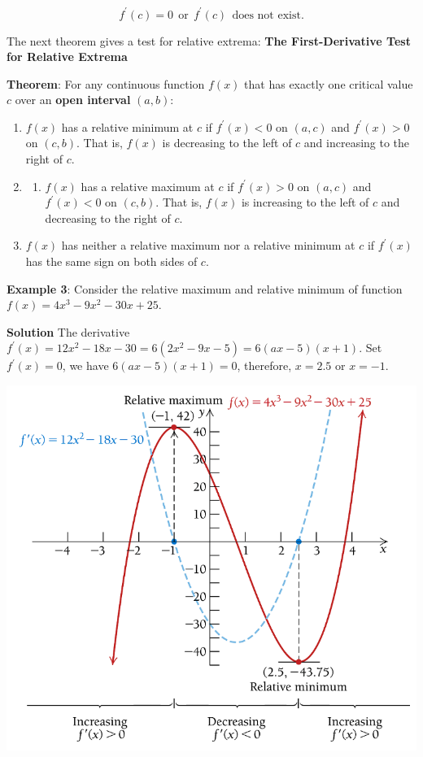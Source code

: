 \documentclass[
]{book}
\providecommand{\tightlist}{%
  \setlength{\itemsep}{0pt}\setlength{\parskip}{0pt}}
\begin{document}
\[
f^\prime(c) = 0 ~~\text{or}~~f^\prime(c) ~~ \text{does not exist.}
\]

The next theorem gives a test for relative extrema: \textbf{The First-Derivative Test for Relative Extrema}

\hfill\break

\textbf{Theorem}: For any continuous function \(f(x)\) that has exactly one critical value \(c\) over an \textbf{open interval} \((a, b)\):

\begin{enumerate}
\def\labelenumi{\arabic{enumi}.}
\item
  \(f(x)\) has a relative minimum at \(c\) if \(f^\prime(x) < 0\) on \((a, c)\) and \(f^\prime(x) > 0\) on \((c, b)\). That is, \(f(x)\) is decreasing to the left of \(c\) and increasing to the right of \(c\).
\item
  \begin{enumerate}
  \def\labelenumii{\arabic{enumii}.}
  \tightlist
  \item
    \(f(x)\) has a relative maximum at \(c\) if \(f^\prime(x) > 0\) on \((a, c)\) and \(f^\prime(x) < 0\) on \((c, b)\). That is, \(f(x)\) is increasing to the left of \(c\) and decreasing to the right of \(c\).
  \end{enumerate}
\item
  \(f(x)\) has neither a relative maximum nor a relative minimum at \(c\) if \(f^\prime(x)\) has the same sign on both sides of \(c\).
\end{enumerate}

\textbf{Example 3}: Consider the relative maximum and relative minimum of function \(f(x) = 4x^3 - 9x^2 - 30x + 25\).

\textbf{Solution} The derivative \(f^\prime(x) = 12x^2 - 18x -30 = 6(2x^2 - 9x - 5) = 6(ax-5)(x+1)\). Set \(f^\prime(x) = 0\), we have \(6(ax-5)(x+1) = 0\), therefore, \(x = 2.5\) or \(x = -1\).

\begin{center}\includegraphics[width=0.6\linewidth]{img07/w07-extrema} \end{center}
\end{document}
